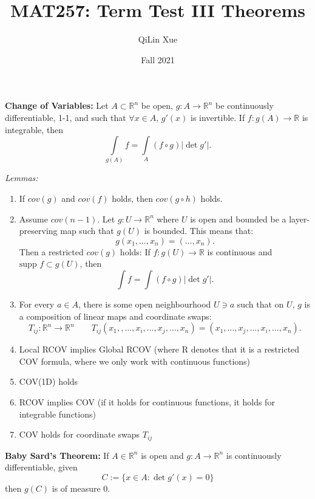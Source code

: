 \documentclass{article}
\title{MAT257: Term Test III Theorems}
\author{QiLin Xue}
\date{Fall 2021}
\numberwithin{equation}{section}
\begin{document}
\maketitle
\begin{theorem}
    \textbf{Change of Variables:} Let $A\subset \mathbb{R}^n$ be open, $g: A\rightarrow \mathbb{R}^n$ be continuously differentiable, 1-1, and such that $\forall x\in A$, $g'(x)$ is invertible. If $f:g(A) \rightarrow \mathbb{R}$ is integrable, then
    \begin{equation}
        \int\limits_{g(A)} f  = \int\limits_{A} (f\circ g)|\det g'|.
    \end{equation}
\end{theorem}
\textit{Lemmas:}
\begin{enumerate}
    \item If $cov(g)$ and $cov(f)$ holds, then $cov(g\circ h)$ holds.
    \item Assume $cov(n-1)$. Let $g: U\rightarrow \mathbb{R}^n$ where $U$ is open and bounded be a layer-preserving map such that $g(U)$ is bounded. This means that:
    \begin{equation}
        g(x_1,\dots,x_n) = (\dots,x_n).
    \end{equation}
    Then a restricted $cov(g)$ holds: If $f:g(U) \rightarrow \mathbb{R}$ is continuous and $\text{supp }f \subset g(U)$, then
    \begin{equation}
        \int f = \int (f\circ g) |\det g'|.
    \end{equation}
    \item For every $a\in A$, there is some open neighbourhood $U \ni a$ such that on $U$, $g$ is a composition of linear maps and coordinate swaps:
    \begin{equation}
        T_{ij}: \mathbb{R}^n \rightarrow \mathbb{R}^n\quad\quad T_{ij}(x_1,,\dots,x_i,\dots,x_j,\dots,x_n) = (x_1,\dots,x_j,\dots,x_i,\dots,x_n).
    \end{equation}
    \item Local RCOV implies Global RCOV (where R denotes that it is a restricted COV formula, where we only work with continuous functions)
    \item COV(1D) holds
    \item RCOV implies COV (if it holds for continuous functions, it holds for integrable functions)
    \item COV holds for coordinate swaps $T_{ij}$
\end{enumerate}
\begin{theorem}
    \textbf{Baby Sard's Theorem:} If $A \in \mathbb{R}^n$ is open and $g:A\rightarrow \mathbb{R}^n$ is continuously differentiable, given
    \begin{equation}
        C:= \{x\in A: \det g'(x) = 0\}
    \end{equation}
    then $g(C)$ is of measure 0.
\end{theorem}
\end{document}
